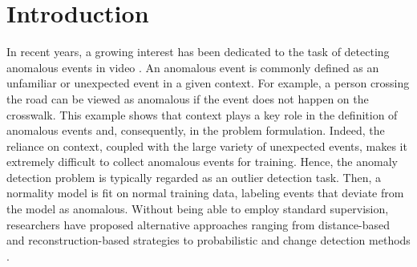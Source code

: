 \documentclass[final]{cvpr}
\begin{document}
\setlength{\abovedisplayskip}{3.5pt}
\setlength{\belowdisplayskip}{3.5pt}

\vspace{-0.2cm}
\section{Introduction}
\vspace{-0.1cm}

In recent years, a growing interest has been dedicated to the task of detecting anomalous events in video \cite{Dong-Access-2020,Doshi-CVPRW-2020a,Doshi-CVPRW-2020b,Gong-ICCV-2019,Ionescu-CVPR-2019,Ionescu-WACV-2019,Ji-IJCNN-2020,Lee-TIP-2019,Lu-ECCV-2020,Nguyen-ICCV-2019,Pang-CVPR-2020,Park-CVPR-2020,Ramachandra-WACV-2020a,Ramachandra-WACV-2020b,Ramachandra-ArXiv-2020,Sun-ACMMM-2020,Tang-PRL-2020,Wang-ACMMM-2020,Wu-TNNLS-2019,Yu-ACMMM-2020,Zaheer-CVPR-2020,Zhang-PR-2020}. An anomalous event is commonly defined as an unfamiliar or unexpected event in a given context. For example, a person crossing the road can be viewed as anomalous if the event does not happen on the crosswalk. This example shows that context plays a key role in the definition of anomalous events and, consequently, in the problem formulation. Indeed, the reliance on context, coupled with the large variety of unexpected events, makes it extremely difficult to collect anomalous events for training. Hence, the anomaly detection problem is typically regarded as an outlier detection task. Then, a normality model is fit on normal training data, labeling events that deviate from the model as anomalous.
Without being able to employ standard supervision, researchers have proposed alternative approaches ranging from distance-based \cite{Ionescu-CVPR-2019,Ionescu-WACV-2019,Ramachandra-WACV-2020a,Ramachandra-WACV-2020b,Ravanbakhsh-WACV-2018,Sabokrou-IP-2017,Sabokrou-CVIU-2018,Saligrama-CVPR-2012,Smeureanu-ICIAP-2017,Sun-PR-2017,Tran-BMVC-2017,Xu-BMVC-2015} and reconstruction-based strategies \cite{Cong-CVPR-2011,Gong-ICCV-2019,Hasan-CVPR-2016,Liu-CVPR-2018,Lu-ICCV-2013,Luo-ICCV-2017,Nguyen-ICCV-2019,Park-CVPR-2020,Ravanbakhsh-ICIP-2017,Tang-PRL-2020,Vu-AAAI-2019} to probabilistic \cite{Adam-PAMI-2008,Antic-ICCV-2011,Cheng-CVPR-2015,Feng-NC-2017,Hinami-ICCV-2017,Kim-CVPR-2009,Mahadevan-CVPR-2010,Mehran-CVPR-2009,Wu-CVPR-2010} and change detection methods \cite{Giorno-ECCV-2016,Ionescu-ICCV-2017,Liu-BMVC-2018,Pang-CVPR-2020}. 
\end{document}
